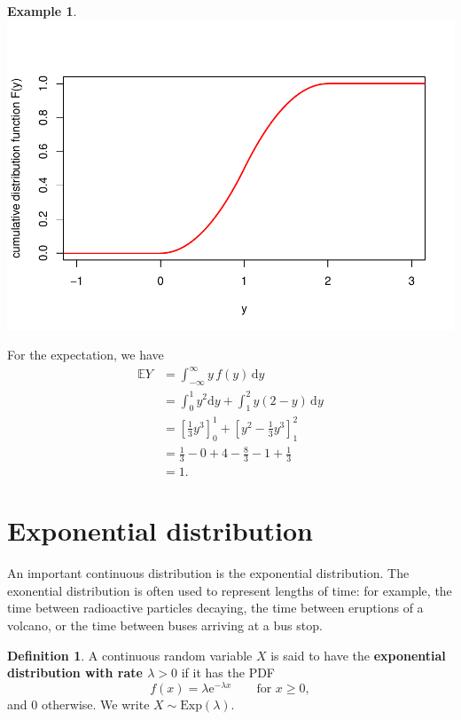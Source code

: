 \documentclass[
  a4paper,
]{book}
\theoremstyle{definition}
\newtheorem{definition}{Definition}[chapter]
\theoremstyle{definition}
\newtheorem{example}{Example}[chapter]
\theoremstyle{definition}
\theoremstyle{definition}
\theoremstyle{remark}
\begin{document}
\begin{example}
\includegraphics{math1710_files/figure-latex/second-cdf-1.pdf}

For the expectation, we have
\begin{align*}
\mathbb EY &= \int_{-\infty}^{\infty} y\, f(y) \, \mathrm dy \\
  &= \int_0^1 y^2 \mathrm dy + \int_1^2 y(2 - y)\, \mathrm dy \\
  &= \left[ \tfrac13 y^3 \right]_0^1 + \left[  y^2 - \tfrac13 y^3 \right]_1^2 \\
  &= \tfrac13 - 0 + 4 - \tfrac83 - 1 + \tfrac13 \\
  &= 1 .
\end{align*}
\end{example}

\hypertarget{exponential}{%
\section{Exponential distribution}\label{exponential}}

An important continuous distribution is the exponential distribution. The exonential distribution is often used to represent lengths of time: for example, the time between radioactive particles decaying, the time between eruptions of a volcano, or the time between buses arriving at a bus stop.

\begin{definition}
A continuous random variable \(X\) is said to have the \textbf{exponential distribution with rate \(\lambda > 0\)} if it has the PDF
\[ f(x) = \lambda \mathrm{e}^{-\lambda x} \qquad \text{for $x \geq 0$}, \]
and 0 otherwise. We write \(X \sim \text{Exp}(\lambda)\).
\end{definition}
\end{document}
